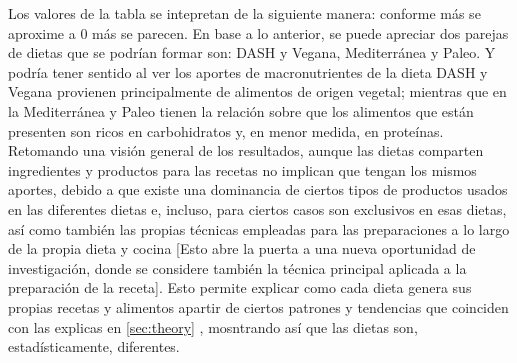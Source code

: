 \documentclass[12pt,a4paper]{article}
\begin{document}
{        Los valores de la tabla se intepretan de la siguiente manera: conforme más se aproxime 
        a $0$ más se parecen. En base a lo anterior, se puede apreciar dos parejas de dietas 
        que se podrían formar son: DASH y Vegana, Mediterránea y Paleo. Y podría tener sentido 
        al ver los aportes de macronutrientes de la dieta DASH y Vegana provienen principalmente de 
        alimentos de origen vegetal; mientras que en la Mediterránea y Paleo tienen la relación sobre 
        que los alimentos que están presenten son ricos en carbohidratos y, en menor medida, en proteínas.\\ 

        Retomando una visión general de los resultados, aunque las dietas comparten ingredientes y 
        productos para las recetas no implican que tengan los mismos aportes, debido a que existe una 
        dominancia de ciertos tipos de productos usados en las diferentes dietas e, incluso, para 
        ciertos casos son exclusivos en esas dietas, así como también las propias técnicas empleadas 
        para las preparaciones a lo largo de la propia dieta y cocina [Esto abre la puerta a una nueva 
        oportunidad de investigación, donde se considere también la técnica principal aplicada a la 
        preparación de la receta]. Esto permite explicar como cada dieta genera 
        sus propias recetas y alimentos apartir de ciertos patrones y tendencias que coinciden 
        con las explicas en \ref{sec:theory} , mosntrando así que las dietas son, 
        estadísticamente, diferentes. 
    }

\newpage

{
    \printbibliography[heading=bibintoc,title={Referencias Bibliográficas}]
}
\end{document}
